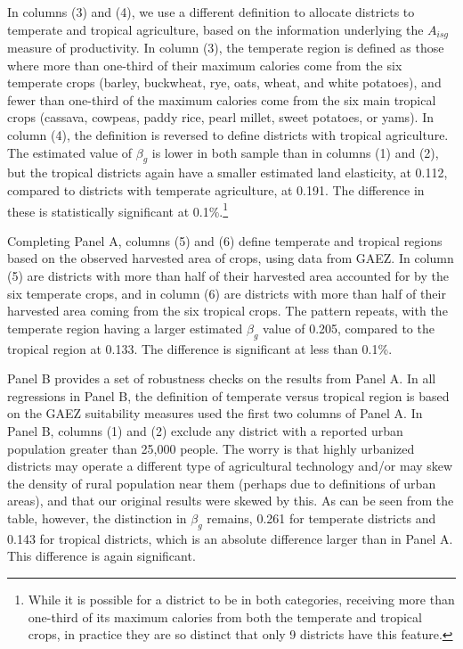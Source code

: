 \documentclass[11pt]{article}
\begin{document}
In columns (3) and (4), we use a different definition to allocate districts to temperate and tropical agriculture, based on the information underlying the $A_{isg}$ measure of productivity. In column (3), the temperate region is defined as those where more than one-third of their maximum calories come from the six temperate crops (barley, buckwheat, rye, oats, wheat, and white potatoes), and fewer than one-third of the maximum calories come from the six main tropical crops (cassava, cowpeas, paddy rice, pearl millet, sweet potatoes, or yams). In column (4), the definition is reversed to define districts with tropical agriculture. The estimated value of $\beta_g$ is lower in both sample than in columns (1) and (2), but the tropical districts again have a smaller estimated land elasticity, at 0.112, compared to districts with temperate agriculture, at 0.191. The difference in these is statistically significant at 0.1\%.\footnote{While it is possible for a district to be in both categories, receiving more than one-third of its maximum calories from both the temperate and tropical crops, in practice they are so distinct that only 9 districts have this feature.}

Completing Panel A, columns (5) and (6) define temperate and tropical regions based on the observed harvested area of crops, using data from GAEZ. In column (5) are districts with more than half of their harvested area accounted for by the six temperate crops, and in column (6) are districts with more than half of their harvested area coming from the six tropical crops. The pattern repeats, with the temperate region having a larger estimated $\beta_g$ value of 0.205, compared to the tropical region at 0.133. The difference is significant at less than 0.1\%.

Panel B provides a set of robustness checks on the results from Panel A. In all regressions in Panel B, the definition of temperate versus tropical region is based on the GAEZ suitability measures used the first two columns of Panel A. In Panel B, columns (1) and (2) exclude any district with a reported urban population greater than 25,000 people. The worry is that highly urbanized districts may operate a different type of agricultural technology and/or may skew the density of rural population near them (perhaps due to definitions of urban areas), and that our original results were skewed by this. As can be seen from the table, however, the distinction in $\beta_g$ remains, 0.261 for temperate districts and 0.143 for tropical districts, which is an absolute difference larger than in Panel A. This difference is again significant.
\end{document}
